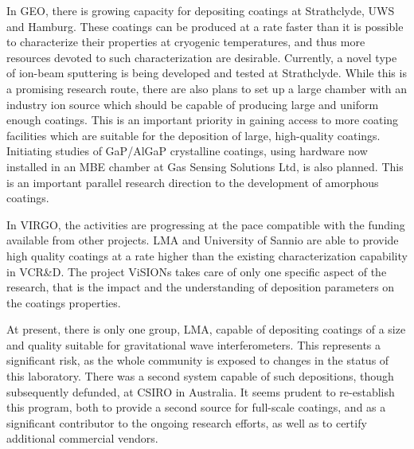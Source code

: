 In GEO, there is growing capacity for depositing coatings at Strathclyde, UWS and Hamburg. These coatings can be produced at a rate faster than it is possible to characterize their properties at cryogenic temperatures, and thus more resources devoted to such characterization are desirable. Currently, a novel type of ion-beam sputtering is being developed and tested at Strathclyde. While this is a promising research route, there are also plans to set up a large chamber with an industry ion source which should be capable of producing large and uniform enough coatings. This is an important priority in gaining access to more coating facilities which are suitable for the deposition of large, high-quality coatings. Initiating studies of GaP/AlGaP crystalline coatings, using hardware now installed in an MBE chamber at Gas Sensing Solutions Ltd, is also planned. This is an important parallel research direction to the development of amorphous coatings.

In VIRGO, the activities are progressing at the pace compatible with the funding available from other projects. LMA and University of Sannio are able to provide high quality coatings at a rate higher than the existing characterization capability in VCR\&D. The project ViSIONs takes care of only one specific aspect of the research, that is the impact and the understanding of deposition parameters on the coatings properties.

At present, there is only one group, LMA, capable of depositing coatings of a size and quality suitable for gravitational wave interferometers. This represents a significant risk, as the whole community is exposed to changes in the status of this laboratory. There was a second system capable of such depositions, though subsequently defunded, at CSIRO in Australia. It seems prudent to re-establish this program, both to provide a second source for full-scale coatings, and as a significant contributor to the ongoing research efforts, as well as to certify additional commercial vendors. 


 \\


 


